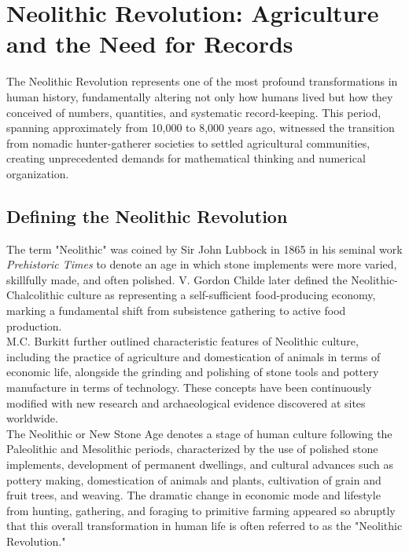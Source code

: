 \documentclass[12pt, oneside, openany]{book}
\begin{document}
\section{Neolithic Revolution: Agriculture and the Need for Records}

The Neolithic Revolution represents one of the most profound transformations in human history, fundamentally altering not only how humans lived but how they conceived of numbers, quantities, and systematic record-keeping. This period, spanning approximately from 10,000 to 8,000 years ago, witnessed the transition from nomadic hunter-gatherer societies to settled agricultural communities, creating unprecedented demands for mathematical thinking and numerical organization.

\subsection{Defining the Neolithic Revolution}

The term "Neolithic" was coined by Sir John Lubbock in 1865 in his seminal work \textit{Prehistoric Times} to denote an age in which stone implements were more varied, skillfully made, and often polished. V. Gordon Childe later defined the Neolithic-Chalcolithic culture as representing a self-sufficient food-producing economy, marking a fundamental shift from subsistence gathering to active food production.\\
M.C. Burkitt further outlined characteristic features of Neolithic culture, including the practice of agriculture and domestication of animals in terms of economic life, alongside the grinding and polishing of stone tools and pottery manufacture in terms of technology. These concepts have been continuously modified with new research and archaeological evidence discovered at sites worldwide.\\
The Neolithic or New Stone Age denotes a stage of human culture following the Paleolithic and Mesolithic periods, characterized by the use of polished stone implements, development of permanent dwellings, and cultural advances such as pottery making, domestication of animals and plants, cultivation of grain and fruit trees, and weaving. The dramatic change in economic mode and lifestyle from hunting, gathering, and foraging to primitive farming appeared so abruptly that this overall transformation in human life is often referred to as the "Neolithic Revolution."
\end{document}
